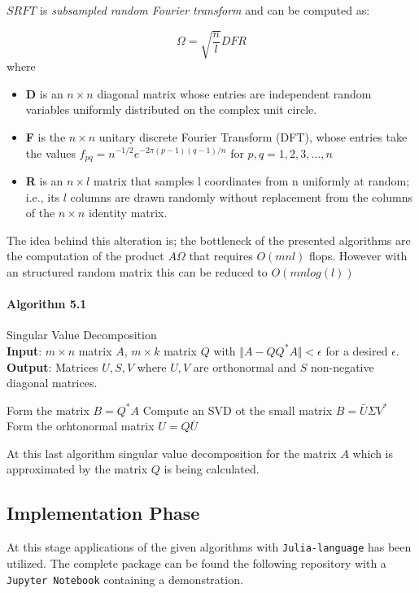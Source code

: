 \documentclass[11pt,a4paper]{article}
\theoremstyle{definition}
\begin{document}
	$SRFT$ is \textit{subsampled random Fourier transform} and can be computed as:
	
	\[ \Omega = \sqrt{\frac{n}{l}}DFR\]
	where
	\begin{itemize}
	\item \textbf{D} is an $n \times n$ diagonal matrix whose entries are independent random variables uniformly distributed on the complex unit circle.
	\item \textbf{F} is the $n \times n$ unitary discrete Fourier Transform (DFT), whose entries take the values $f_{pq} = n^{-1/2}e^{-2\pi (p-1)(q-1) / n}$ for $p,q = 1,2,3,...,n$
	\item \textbf{R} is an $n \times l$ matrix that samples l coordinates from n uniformly at random; i.e., its $l$ columns are drawn randomly without replacement from the columns of the $ n \times n$ identity matrix.
	\end{itemize}

	The idea behind this alteration is; the bottleneck of the presented algorithms are the computation of the product $A \Omega$ that requires $O(mnl)$ flops. However with an structured random matrix this can be reduced to $O(mnlog(l))$
	
	\paragraph{Algorithm 5.1} 	Singular Value Decomposition \\	
	\textbf{Input}: $m \times n$ matrix $A$, $m \times k$ matrix $Q$ with $\Vert A- QQ^*A \Vert < \epsilon$ for a desired $\epsilon$. \\
	\textbf{Output}: Matrices $U,S,V$ where $U,V$ are orthonormal and $S$ non-negative diagonal matrices.
	\begin{algorithmic}[1]
		\State Form the matrix $B = Q^*A$
		\State Compute an SVD ot the small matrix $B=\bar{U} \Sigma V^*$
		\State Form the orhtonormal matrix $U = Q \bar{U}$
	\end{algorithmic}
	
	At this last algorithm singular value decomposition for the matrix $A$ which is approximated by the matrix $Q$ is being calculated.
	
	\subsection{Implementation Phase}
	At this stage applications of the given algorithms with \texttt{Julia-language} has been utilized. The complete package can be found the following repository with a \texttt{Jupyter Notebook} containing a demonstration.
	
\end{document}

